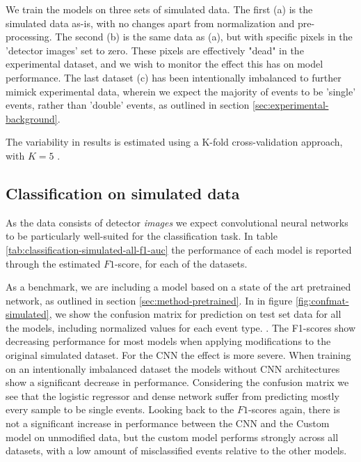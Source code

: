 \noindent We train the models on three sets of simulated data.
The first (a) is the simulated data as-is, with no changes apart from normalization
and pre-processing. The second (b) is the same data as (a), but with specific pixels in
the 'detector images' set to zero. These pixels are effectively "dead" in the
experimental dataset, and we wish to monitor the effect this has on model performance.
The last dataset (c) has been intentionally imbalanced to further mimick experimental data,
wherein we expect the majority of events to be 'single' events, rather than 'double'
events, as outlined in section \ref{sec:experimental-background}.

\noindent The variability in results is estimated using a K-fold cross-validation approach, with
$K = 5$ \cite{Stone1974}.

\subsection{Classification on simulated data}
As the data consists of detector \textit{images} we expect convolutional
neural networks to be particularly well-suited for the classification task.
In table \ref{tab:classification-simulated-all-f1-auc} the performance of each model
is reported through the estimated $F1$-score, for each of the datasets. 

As a benchmark, we are including a model based on a state of the art pretrained 
network\cite{Simonyan2015}, as outlined in section \ref{sec:method-pretrained}. 
In in figure \ref{fig:confmat-simulated}, we show the confusion matrix for prediction
on test set data for all the models, including normalized values for each event type.
. The F1-scores show decreasing
performance for most models when applying modifications to the original simulated dataset.
For the CNN the effect is more severe. When training on an intentionally imbalanced
dataset the models without CNN architectures show a significant decrease in performance.
Considering the confusion matrix we see that the logistic regressor and dense network
suffer from predicting mostly every sample to be single events. Looking back to the
$F1$-scores again, there is not a significant increase in performance between the
CNN and the Custom model on unmodified data, but the custom model performs strongly
across all datasets, with a low amount of misclassified events relative to the other
models.

